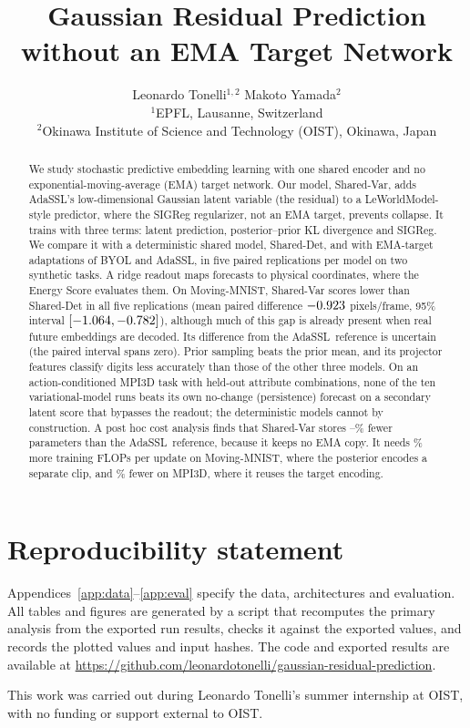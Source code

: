 \documentclass{article}
\title{Gaussian Residual Prediction\\without an EMA Target Network}
\author{%
  Leonardo Tonelli$^{1,2}$ \qquad Makoto Yamada$^{2}$ \\
  $^{1}$EPFL, Lausanne, Switzerland \\
  $^{2}$Okinawa Institute of Science and Technology (OIST), Okinawa, Japan
}
\newcommand{\emavar}{\mbox{AdaSSL reference}}
\newcommand{\shdet}{\mbox{Shared-Det}}
\newcommand{\shvar}{\mbox{Shared-Var}}
\begin{document}
\maketitle

\begin{abstract}
We study stochastic predictive embedding learning with one shared encoder and no exponential-moving-average (EMA) target network. Our model, \shvar{}, adds AdaSSL's low-dimensional Gaussian latent variable (the residual) to a LeWorldModel-style predictor, where the SIGReg regularizer, not an EMA target, prevents collapse. It trains with three terms: latent prediction, posterior--prior KL divergence and SIGReg. We compare it with a deterministic shared model, \shdet{}, and with EMA-target adaptations of BYOL and AdaSSL, in five paired replications per model on two synthetic tasks. A ridge readout maps forecasts to physical coordinates, where the Energy Score evaluates them. On Moving-MNIST, \shvar{} scores lower than \shdet{} in all five replications (mean paired difference $-0.923$ pixels/frame, 95\% interval $[-1.064,-0.782]$), although much of this gap is already present when real future embeddings are decoded. Its difference from the \emavar{} is uncertain (the paired interval spans zero). Prior sampling beats the prior mean, and its projector features classify digits less accurately than those of the other three models. On an action-conditioned MPI3D task with held-out attribute combinations, none of the ten variational-model runs beats its own no-change (persistence) forecast on a secondary latent score that bypasses the readout; the deterministic models cannot by construction. A post hoc cost analysis finds that \shvar{} stores \VMMCostParamsVsROne--\VMPCostParamsVsROne\% fewer parameters than the \emavar{}, because it keeps no EMA copy. It needs \VMMCostFlopsVsROne\% more training FLOPs per update on Moving-MNIST, where the posterior encodes a separate clip, and \VMPCostFlopsVsROne\% fewer on MPI3D, where it reuses the target encoding.
\end{abstract}









\section*{Reproducibility statement}
Appendices~\ref{app:data}--\ref{app:eval} specify the data, architectures and evaluation. All tables and figures are generated by a script that recomputes the primary analysis from the exported run results, checks it against the exported values, and records the plotted values and input hashes. The code and exported results are available at \url{https://github.com/leonardotonelli/gaussian-residual-prediction}.

\begin{ack}
This work was carried out during Leonardo Tonelli's summer internship at OIST, with no funding or support external to OIST.
\end{ack}




\clearpage

\end{document}
